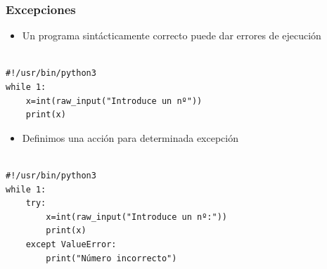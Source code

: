 







\begin{frame}[fragile]
\frametitle{Excepciones}
\begin{itemize}
\item Un programa sintácticamente correcto puede dar errores de ejecución
\end{itemize}

  \begin{footnotesize}
\begin{verbatim}

#!/usr/bin/python3
while 1:
    x=int(raw_input("Introduce un nº"))
    print(x)

\end{verbatim}
  \end{footnotesize}

\end{frame}




\begin{frame}[fragile]

\begin{itemize}
\item  Definimos una acción para determinada excepción
\end{itemize}

  \begin{footnotesize}
\begin{verbatim}

#!/usr/bin/python3
while 1:
    try:
        x=int(raw_input("Introduce un nº:"))
        print(x)
    except ValueError:
        print("Número incorrecto")

\end{verbatim}
  \end{footnotesize}


\end{frame}



